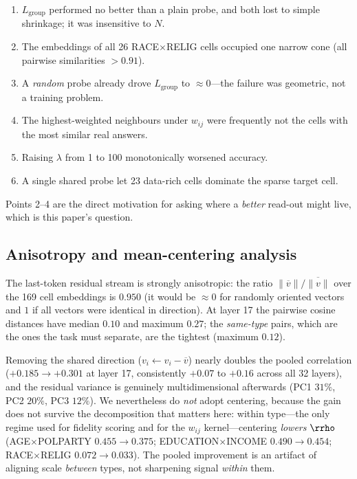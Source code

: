 \begin{enumerate}
  \item $L_{\text{group}}$ performed no better than a plain probe, and
        both lost to simple shrinkage; it was insensitive to $N$.
  \item The embeddings of all 26 RACE$\times$RELIG cells occupied one
        narrow cone (all pairwise similarities $>0.91$).
  \item A \emph{random} probe already drove $L_{\text{group}}$ to
        $\approx0$---the failure was geometric, not a training problem.
  \item The highest-weighted neighbours under $w_{ij}$ were frequently
        not the cells with the most similar real answers.
  \item Raising $\lambda$ from 1 to 100 monotonically worsened accuracy.
  \item A single shared probe let 23 data-rich cells dominate the sparse
        target cell.
\end{enumerate}

Points 2--4 are the direct motivation for asking where a \emph{better}
read-out might live, which is this paper's question.

\subsection{Anisotropy and mean-centering analysis}
\label{app:anisotropy}
The last-token residual stream is strongly anisotropic: the ratio
$\lVert\overline{v}\rVert / \overline{\lVert v\rVert}$ over the 169 cell
embeddings is $0.950$ (it would be $\approx0$ for randomly oriented
vectors and $1$ if all vectors were identical in direction). At layer 17
the pairwise cosine distances have median $0.10$ and maximum $0.27$; the
\emph{same-type} pairs, which are the ones the task must separate, are
the tightest (maximum $0.12$).

Removing the shared direction ($v_i \leftarrow v_i - \overline{v}$) nearly
doubles the pooled correlation ($+0.185 \to +0.301$ at layer 17,
consistently $+0.07$ to $+0.16$ across all 32 layers), and the residual
variance is genuinely multidimensional afterwards (PC1 $31\%$, PC2
$20\%$, PC3 $12\%$). We nevertheless do \emph{not} adopt centering,
because the gain does not survive the decomposition that matters here:
within type---the only regime used for fidelity scoring and for the
$w_{ij}$ kernel---centering \emph{lowers} $\rrho$
(AGE$\times$POLPARTY $0.455\to0.375$; EDUCATION$\times$INCOME
$0.490\to0.454$; RACE$\times$RELIG $0.072\to0.033$). The pooled
improvement is an artifact of aligning scale \emph{between} types, not
sharpening signal \emph{within} them.
